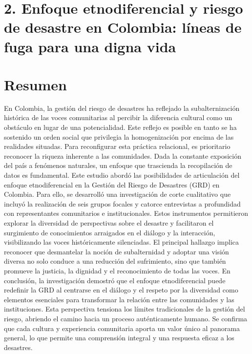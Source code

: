 \documentclass[
  spanish,
  letterpaper,
]{book}
\begin{document}

\chapter{2. Enfoque etnodiferencial y riesgo de desastre en Colombia:
líneas de fuga para una digna
vida}\label{enfoque-etnodiferencial-y-riesgo-de-desastre-en-colombia-luxedneas-de-fuga-para-una-digna-vida}

\label{resumen}

\chapter{Resumen}\label{resumen-1}

En Colombia, la gestión del riesgo de desastres ha reflejado la
subalternización histórica de las voces comunitarias al percibir la
diferencia cultural como un obstáculo en lugar de una potencialidad.
Este reflejo es posible en tanto se ha sostenido un orden social que
privilegia la homogenización por encima de las realidades situadas. Para
reconfigurar esta práctica relacional, es prioritario reconocer la
riqueza inherente a las comunidades. Dada la constante exposición del
país a fenómenos naturales, un enfoque que trascienda la recopilación de
datos es fundamental. Este estudio abordó las posibilidades de
articulación del enfoque etnodiferencial en la Gestión del Riesgo de
Desastres (GRD) en Colombia. Para ello, se desarrolló una investigación
de corte cualitativo que incluyó la realización de seis grupos focales y
catorce entrevistas a profundidad con representantes comunitarios e
institucionales. Estos instrumentos permitieron explorar la diversidad
de perspectivas sobre el desastre y facilitaron el surgimiento de
conocimientos arraigados en el diálogo y la interacción, visibilizando
las voces históricamente silenciadas. El principal hallazgo implica
reconocer que desmantelar la noción de subalternidad y adoptar una
visión diversa no solo conduce a una reducción del sufrimiento, sino que
también promueve la justicia, la dignidad y el reconocimiento de todas
las voces. En conclusión, la investigación demostró que el enfoque
etnodiferencial puede redefinir la GRD al centrarse en el diálogo y el
respeto por la diversidad como elementos esenciales para transformar la
relación entre las comunidades y las instituciones. Esta perspectiva
tensiona los límites tradicionales de la gestión del riesgo, abriendo el
camino hacia un proceso auténticamente humano. Se confirma que cada
cultura y experiencia comunitaria aporta un valor único al panorama
general, lo que permite una comprensión integral y una respuesta eficaz
a los desastres.
\end{document}
